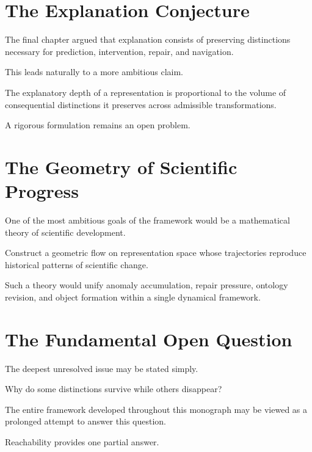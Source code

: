 \documentclass[11pt,oneside,openany]{book}
\begin{document}
\section{The Explanation Conjecture}

The final chapter argued that explanation consists of preserving distinctions necessary for prediction, intervention, repair, and navigation.

This leads naturally to a more ambitious claim.

\begin{conjecture}

The explanatory depth of a representation is proportional to the volume of consequential distinctions it preserves across admissible transformations.

\end{conjecture}

A rigorous formulation remains an open problem.

\section{The Geometry of Scientific Progress}

One of the most ambitious goals of the framework would be a mathematical theory of scientific development.

\begin{problem}

Construct a geometric flow on representation space whose trajectories reproduce historical patterns of scientific change.

\end{problem}

Such a theory would unify anomaly accumulation, repair pressure, ontology revision, and object formation within a single dynamical framework.

\section{The Fundamental Open Question}

The deepest unresolved issue may be stated simply.

Why do some distinctions survive while others disappear?

The entire framework developed throughout this monograph may be viewed as a prolonged attempt to answer this question.

Reachability provides one partial answer.
\end{document}
